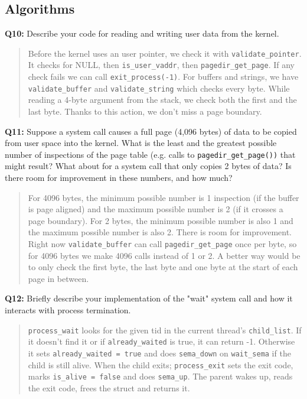 \documentclass[a4paper,11pt]{paper}
\begin{document}
\subsection{Algorithms}

\textbf{Q10:} Describe your code for reading and writing user data from the kernel.
\begin{quote}
Before the kernel uses an user pointer, we check it with \texttt{validate\_pointer}. It checks for NULL, then \texttt{is\_user\_vaddr}, then \texttt{pagedir\_get\_page}. If any check fails we can call \texttt{exit\_process(-1)}.
For buffers and strings, we have \texttt{validate\_buffer} and \texttt{validate\_string} which checks every byte. While reading a 4-byte argument from the stack, we check both the first and the last byte. Thanks to this action, we don't miss a page boundary.
\end{quote}

\textbf{Q11:} Suppose a system call causes a full page (4,096 bytes) of data to be copied from user space into the kernel.  What is the least and the greatest possible number of inspections of the page table (e.g. calls to \texttt{pagedir\_get\_page())} that might result?  What about for a system call that only copies 2 bytes of data?  Is there room for improvement in these numbers, and how much?
\begin{quote}
For 4096 bytes, the minimum possible number is 1 inspection (if the buffer is page aligned) and the maximum possible number is 2 (if it crosses a page boundary).
For 2 bytes, the minimum possible number is also 1 and the maximum possible number is also 2.
There is room for improvement. Right now \texttt{validate\_buffer} can call \texttt{pagedir\_get\_page} once per byte, so for 4096 bytes we make 4096 calls instead of 1 or 2. A better way would be to only check the first byte, the last byte and one byte at the start of each page in between.
\end{quote}

\textbf{Q12:} Briefly describe your implementation of the "wait" system call and how it interacts with process termination.
\begin{quote}
\texttt{process\_wait} looks for the given tid in the current thread's \texttt{child\_list}. If it doesn't find it or if \texttt{already\_waited} is true, it can return -1. Otherwise it sets \texttt{already\_waited = true} and does \texttt{sema\_down} on \texttt{wait\_sema} if the child is still alive.
When the child exits; \texttt{process\_exit} sets the exit code, marks \texttt{is\_alive = false} and does \texttt{sema\_up}. The parent wakes up, reads the exit code, frees the struct and returns it.
\end{quote}
\end{document}
